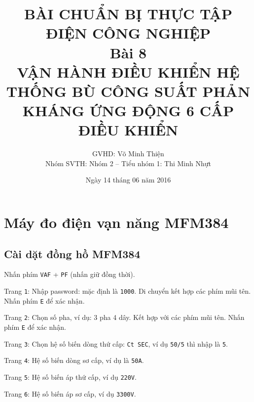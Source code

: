 \documentclass[13pt,a4paper]{extarticle}
\begin{document}
\title{\large{\textbf{BÀI CHUẨN BỊ THỰC TẬP ĐIỆN CÔNG NGHIỆP}}\\\vspace{1cm}\textbf{Bài 8}\\\vspace{.5cm}\textbf{VẬN HÀNH ĐIỀU KHIỂN HỆ THỐNG BÙ CÔNG SUẤT PHẢN KHÁNG ỨNG ĐỘNG 6 CẤP ĐIỀU KHIỂN}}
\date{Ngày 14 tháng 06 năm 2016}
\author{GVHD: Võ Minh Thiện \vspace{.6cm}\\  Nhóm SVTH: Nhóm 2 -- Tiểu nhóm 1: Thi Minh Nhựt}
\maketitle
\tableofcontents
\newpage
{}
\setcounter{page}{1}
\section{Máy đo điện vạn năng MFM384}
\subsection{Cài dặt đồng hồ MFM384}
\begin{list}{--}{}
\item Nhấn phím \verb|VAF| + \verb|PF| (nhấn giữ đồng thời).
\item Trang \verb|1|: Nhập password: mặc định là \verb|1000|. Di chuyển kết hợp các phím mũi tên. Nhấn phím \verb|E| để xác nhận.
\item Trang \verb|2|: Chọn số pha, ví dụ: 3 pha 4 dây. Kết hợp với các phím mũi tên. Nhấn phím \verb|E| để xác nhận.
\item Trang \verb|3|: Chọn hệ số biến dòng thứ cấp: \verb|Ct SEC|, ví dụ \verb|50/5| thì nhập là \verb|5|.
\item Trang \verb|4|: Hệ số biến dòng sơ cấp, ví dụ là \verb|50A|.
\item Trang \verb|5|: Hệ số biến áp thứ cấp, ví dụ \verb|220V|.
\item Trang \verb|6|: Hệ số biến áp sơ cấp, ví dụ \verb|3300V|.
\end{list}
\end{document}
